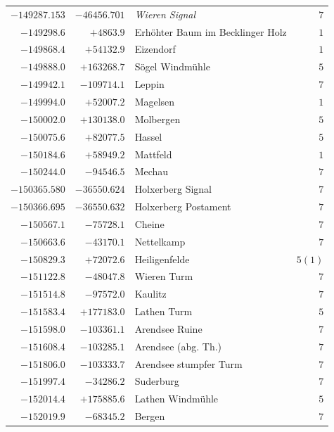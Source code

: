 \begin{center}
\begin{tabular}{r|r|p{170pt}|r}
\(-149287.153\)&\(-46456.701\)&\textit{Wieren Signal}&\(7\)\\
\(-149298.6\)&\(+4863.9\)&Erhöhter Baum im Becklinger Holz&\(1\)\\
\(-149868.4\)&\(+54132.9\)&Eizendorf&\(1\)\\
\(-149888.0\)&\(+163268.7\)&Sögel Windmühle&\(5\)\\
\(-149942.1\)&\(-109714.1\)&Leppin&\(7\)\\
\(-149994.0\)&\(+52007.2\)&Magelsen&\(1\)\\
\(-150002.0\)&\(+130138.0\)&Molbergen&\(5\)\\
\(-150075.6\)&\(+82077.5\)&Hassel&\(5\)\\
\(-150184.6\)&\(+58949.2\)&Mattfeld&\(1\)\\
\(-150244.0\)&\(-94546.5\)&Mechau&\(7\)\\
\(-150365.580\)&\(-36550.624\)&Holxerberg Signal&\(7\)\\
\(-150366.695\)&\(-36550.632\)&Holxerberg Postament&\(7\)\\
\(-150567.1\)&\(-75728.1\)&Cheine&\(7\)\\
\(-150663.6\)&\(-43170.1\)&Nettelkamp&\(7\)\\
\(-150829.3\)&\(+72072.6\)&Heiligenfelde&\(5 (1)\)\\
\(-151122.8\)&\(-48047.8\)&Wieren Turm&\(7\)\\
\(-151514.8\)&\(-97572.0\)&Kaulitz&\(7\)\\
\(-151583.4\)&\(+177183.0\)&Lathen Turm&\(5\)\\
\(-151598.0\)&\(-103361.1\)&Arendsee Ruine&\(7\)\\
\(-151608.4\)&\(-103285.1\)&Arendsee (abg. Th.)&\(7\)\\
\(-151806.0\)&\(-103333.7\)&Arendsee stumpfer Turm&\(7\)\\
\(-151997.4\)&\(-34286.2\)&Suderburg&\(7\)\\
\(-152014.4\)&\(+175885.6\)&Lathen Windmühle&\(5\)\\
\(-152019.9\)&\(-68345.2\)&Bergen&\(7\)\\
\hline\end{tabular}\endgroup\end{center}
\clearpage
